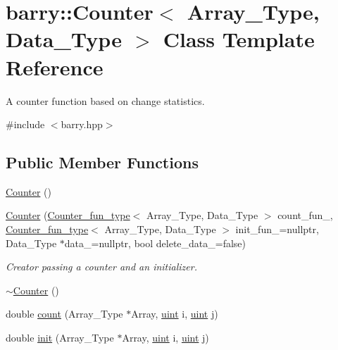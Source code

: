\hypertarget{classbarry_1_1_counter}{}\section{barry\+:\+:Counter$<$ Array\+\_\+\+Type, Data\+\_\+\+Type $>$ Class Template Reference}
\label{classbarry_1_1_counter}


A counter function based on change statistics.  




{\ttfamily \#include $<$barry.\+hpp$>$}

\subsection*{Public Member Functions}
\begin{DoxyCompactItemize}
\item 
\hyperlink{classbarry_1_1_counter_a3c990d6dbcdc553b3179c8353497a7df}{Counter} ()
\item 
\hyperlink{classbarry_1_1_counter_a1e886197c8f42b2552ada2786726fa38}{Counter} (\hyperlink{namespacebarry_abaaae3200da8e4b7faac3c04fe9c3081}{Counter\+\_\+fun\+\_\+type}$<$ Array\+\_\+\+Type, Data\+\_\+\+Type $>$ count\+\_\+fun\+\_\+, \hyperlink{namespacebarry_abaaae3200da8e4b7faac3c04fe9c3081}{Counter\+\_\+fun\+\_\+type}$<$ Array\+\_\+\+Type, Data\+\_\+\+Type $>$ init\+\_\+fun\+\_\+=nullptr, Data\+\_\+\+Type $\ast$data\+\_\+=nullptr, bool delete\+\_\+data\+\_\+=false)
\begin{DoxyCompactList}\small\item\em Creator passing a counter and an initializer. \end{DoxyCompactList}\item 
\hyperlink{classbarry_1_1_counter_ad899c3d55bb15e76ed7df05006e88b38}{$\sim$\+Counter} ()
\item 
double \hyperlink{classbarry_1_1_counter_afe1d23e72c3bdca9b2481f36ebde1d95}{count} (Array\+\_\+\+Type $\ast$Array, \hyperlink{namespacebarry_a11dfc53ddb4672278319aa04f1e09a6c}{uint} i, \hyperlink{namespacebarry_a11dfc53ddb4672278319aa04f1e09a6c}{uint} j)
\item 
double \hyperlink{classbarry_1_1_counter_ae0451979ddc51a5fbf00de78c37d3216}{init} (Array\+\_\+\+Type $\ast$Array, \hyperlink{namespacebarry_a11dfc53ddb4672278319aa04f1e09a6c}{uint} i, \hyperlink{namespacebarry_a11dfc53ddb4672278319aa04f1e09a6c}{uint} j)
\end{DoxyCompactItemize}
